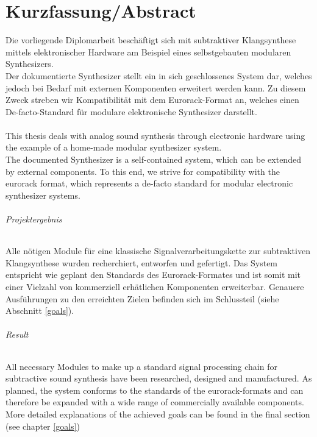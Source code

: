 \chapter*{Kurzfassung/Abstract}
\label{cha:abstract}

Die vorliegende Diplomarbeit beschäftigt sich mit subtraktiver Klangsynthese mittels elektronischer Hardware am Beispiel eines selbstgebauten modularen Synthesizers. \\

Der dokumentierte Synthesizer stellt ein in sich geschlossenes System dar, welches jedoch bei Bedarf mit externen Komponenten erweitert werden kann. Zu diesem Zweck streben wir Kompatibilität mit dem Eurorack-Format an, welches einen De-facto-Standard für modulare elektronische Synthesizer darstellt. \\ \\

This thesis deals with analog sound synthesis through electronic hardware using the example of a home-made modular synthesizer system. \\

The documented Synthesizer is a self-contained system, which can be extended by external components. To this end, we strive for compatibility with the eurorack format, which represents a de-facto standard for modular electronic synthesizer systems. \\

\newpage

\subparagraph{Projektergebnis}
Alle nötigen Module für eine klassische Signalverarbeitungskette zur subtraktiven Klangsynthese wurden recherchiert, entworfen und gefertigt. Das System entspricht wie geplant den Standards des Eurorack-Formates und ist somit mit einer Vielzahl von kommerziell erhätlichen Komponenten erweiterbar. Genauere Ausführungen zu den erreichten Zielen befinden sich im Schlussteil (siehe Abschnitt \ref{goals}).

\subparagraph{Result}
All necessary Modules to make up a standard signal processing chain for subtractive sound synthesis have been researched, designed and manufactured. As planned, the system conforms to the standards of the eurorack-formats and can therefore be expanded with a wide range of commercially available components. More detailed explanations of the achieved goals can be found in the final section (see chapter \ref{goals})

